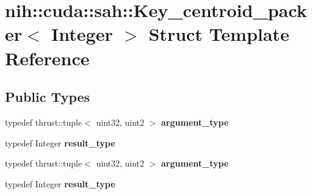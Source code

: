 \hypertarget{structnih_1_1cuda_1_1sah_1_1_key__centroid__packer}{
\section{nih\-:\-:cuda\-:\-:sah\-:\-:\-Key\-\_\-centroid\-\_\-packer$<$ \-Integer $>$ \-Struct \-Template \-Reference}
\label{structnih_1_1cuda_1_1sah_1_1_key__centroid__packer}
}
\subsection*{\-Public \-Types}
\begin{DoxyCompactItemize}
\item 
\hypertarget{structnih_1_1cuda_1_1sah_1_1_key__centroid__packer_ae4c4e4f6d9b6774bddd8ace8a1f55b6f}{
typedef thrust\-::tuple$<$ uint32, \*
uint2 $>$ {\bfseries argument\-\_\-type}}
\label{structnih_1_1cuda_1_1sah_1_1_key__centroid__packer_ae4c4e4f6d9b6774bddd8ace8a1f55b6f}

\item 
\hypertarget{structnih_1_1cuda_1_1sah_1_1_key__centroid__packer_abe2fe416daa1a771fcf668813631aaf6}{
typedef \-Integer {\bfseries result\-\_\-type}}
\label{structnih_1_1cuda_1_1sah_1_1_key__centroid__packer_abe2fe416daa1a771fcf668813631aaf6}

\item 
\hypertarget{structnih_1_1cuda_1_1sah_1_1_key__centroid__packer_ae4c4e4f6d9b6774bddd8ace8a1f55b6f}{
typedef thrust\-::tuple$<$ uint32, \*
uint2 $>$ {\bfseries argument\-\_\-type}}
\label{structnih_1_1cuda_1_1sah_1_1_key__centroid__packer_ae4c4e4f6d9b6774bddd8ace8a1f55b6f}

\item 
\hypertarget{structnih_1_1cuda_1_1sah_1_1_key__centroid__packer_abe2fe416daa1a771fcf668813631aaf6}{
typedef \-Integer {\bfseries result\-\_\-type}}
\label{structnih_1_1cuda_1_1sah_1_1_key__centroid__packer_abe2fe416daa1a771fcf668813631aaf6}

\end{DoxyCompactItemize}
